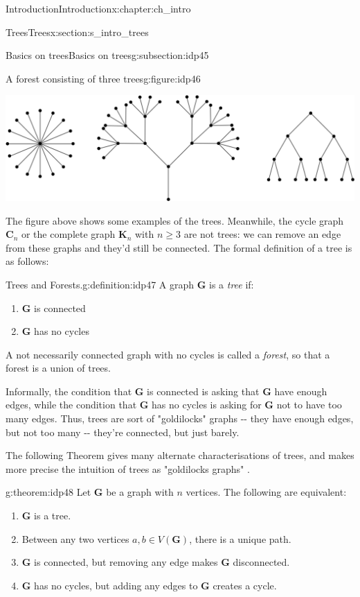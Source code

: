 \documentclass[oneside,10pt,]{book}
\numberwithin{equation}{section}
\newcommand{\bfC}{\mathbf{C}}
\newcommand{\bfG}{\mathbf{G}}
\newcommand{\bfK}{\mathbf{K}}
\begin{document}
\begin{chapterptx}{Introduction}{}{Introduction}{}{}{x:chapter:ch_intro}
\begin{sectionptx}{Trees}{}{Trees}{}{}{x:section:s_intro_trees}
\begin{subsectionptx}{Basics on trees}{}{Basics on trees}{}{}{g:subsection:idp45}
\begin{figureptx}{A forest consisting of three trees}{g:figure:idp46}{}
\begin{image}{0.1}{0.8}{0.1}
\includegraphics[width=\linewidth]{images/forest.png}
\end{image}%
\tcblower
\end{figureptx}%
The figure above shows some examples of the trees.  Meanwhile, the cycle graph \(\bfC_n\) or the complete graph \(\bfK_n\) with \(n\geq 3\) are not trees: we can remove an edge from these graphs and they'd still be connected. The formal definition of a tree is as follows:%
\begin{definition}{Trees and Forests.}{g:definition:idp47}%
A graph \(\bfG\) is a \emph{tree} if:%
%
\begin{enumerate}
\item{}\(\bfG\) is connected%
\item{}\(\bfG\) has no cycles%
\end{enumerate}
A not necessarily connected graph with no cycles is called a \emph{forest}, so that a forest is a union of trees.%
\end{definition}
Informally, the condition that \(\bfG\) is connected is asking that \(\bfG\) have enough edges, while the condition that \(\bfG\) has no cycles is asking for \(\bfG\) not to have too many edges.  Thus, trees are sort of "goldilocks" graphs -{}-{} they have enough edges, but not too many -{}-{} they're connected, but just barely.%
\par
The following Theorem gives many alternate characterisations of trees, and makes more precise the intuition of trees as "goldilocks graphs"%
. \begin{theorem}{}{}{g:theorem:idp48}%
Let \(\bfG\) be a graph with \(n\) vertices.  The following are equivalent:%
%
\begin{enumerate}
\item{}\(\bfG\) is a tree.%
\item{}Between any two vertices \(a,b\in V(\bfG)\), there is a unique path.%
\item{}\(\bfG\) is connected, but removing any edge makes \(\bfG\) disconnected.%
\item{}\(\bfG\) has no cycles, but adding any edges to \(\bfG\) creates a cycle.%

\end{enumerate}
\end{theorem}
\end{subsectionptx}
\end{sectionptx}
\end{chapterptx}
\end{document}
